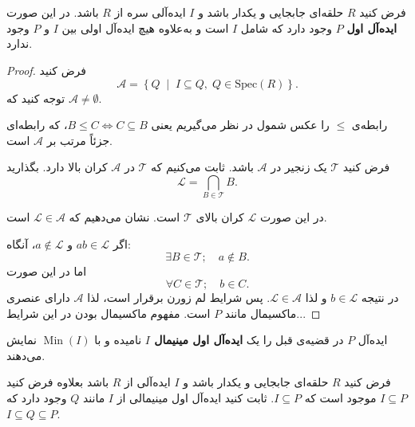 \section{}

\begin{theorem}
    فرض کنید $R$ حلقه‌ای جابجایی و یکدار باشد و $I$ ایده‌آلی سره از $R$ باشد. در این صورت \textbf{ایده‌آل اول} $P$ وجود دارد که شامل $I$ است و به‌علاوه هیچ ایده‌آل اولی بین $I$ و $P$ وجود ندارد.
\end{theorem}
\begin{proof}
    فرض کنید
    \[
        \mathcal{A} = \left\{ Q \;\middle|\; I \subseteq Q,\; Q \in \mathrm{Spec}(R) \right\}.
    \]
    توجه کنید که $\mathcal{A} \ne \emptyset$.

    رابطه‌ی $\leq$ را عکس شمول در نظر می‌گیریم یعنی $B \leq C \Leftrightarrow C \subseteq B$، که رابطه‌ای جزئاً مرتب بر $\mathcal{A}$ است.

    فرض کنید $\mathcal{T}$ یک زنجیر در $\mathcal{A}$ باشد. ثابت می‌کنیم که $\mathcal{T}$ در $\mathcal{A}$ کران بالا دارد. بگذارید
    \[
        \mathcal{L} = \bigcap_{B \in \mathcal{T}} B.
    \]

    در این صورت $\mathcal{L} $ کران بالای $\mathcal{T}$ است. نشان می‌دهیم که $\mathcal{L}  \in \mathcal{A}$ است.

    اگر $ab \in \mathcal{L} $ و $a \notin \mathcal{L} $، آنگاه:
    \[
        \exists B \in \mathcal{T}; \quad  a \notin B.
    \]
    اما در این صورت
    \[
        \forall C \in \mathcal{T}; \quad b \in C.
    \]
    در نتیجه \(b \in \mathcal{L}\) و لذا \(\mathcal{L} \in \mathcal{A}\).
    پس شرایط لم زورن برقرار است، لذا \(\mathcal{A}\) دارای عنصری ماکسیمال مانند \(P\) است.
    مفهوم ماکسیمال بودن در این شرایط...

\end{proof}



\begin{definition}
    ایده‌آل $P$ در قضیه‌ی قبل را یک \textbf{ایده‌آل اول مینیمال $I$} نامیده و با $\operatorname{Min}(I)$ نمایش می‌دهند.
\end{definition}
\begin{assignment}
    فرض کنید $R$ حلقه‌ای جابجایی و یکدار باشد و $I$ ایده‌آلی از $R$ باشد    بعلاوه فرض کنید  $I \subseteq P$   موجود است که $I \subseteq P$. ثابت کنید ایده‌آل اول مینیمالی از \(I\) مانند \(Q\) وجود دارد که  $I \subseteq Q \subseteq P$.

\end{assignment}

